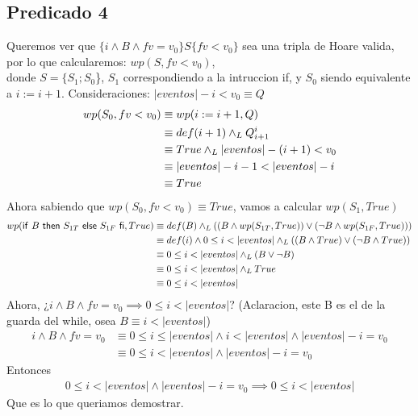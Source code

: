 \documentclass[../document.tex]{subfiles}
\begin{document}
\subsection*{Predicado 4}

Queremos ver que $\{i\land B\land fv=v_0\}S\{fv<v_0\}$ sea una tripla de Hoare valida, por lo que calcularemos: $wp(S, fv<v_0)$,
\\ donde $S=\{S_1;S_0$\}, $S_1$ correspondiendo a la intruccion if, y $S_0$ siendo equivalente a $i:=i+1$.
\salto{\baselineskip}
Consideraciones: $|eventos|-i<v_0 \equiv Q$
\begin{align*}
    wp(S_0, fv<v_0)&\equiv wp(i:=i+1, Q)
    \\&\equiv def(i+1)\yLuego Q_{i+1}^i
    \\&\equiv True\yLuego |eventos|-(i+1)<v_0
    \\&\equiv |eventos|-i-1<|eventos|-i
    \\&\equiv True
\end{align*}
Ahora sabiendo que $wp(S_0, fv<v_0) \equiv True$, vamos a calcular $wp(S_1, True)$
\begin{align*}
    wp(\mathsf{if}\ B\ \mathsf{then}\ S_{1T}\ \mathsf{else}\ S_{1F}\ \mathsf{fi}, True)&\equiv def(B) \land _L ((B\land wp(S_{1T},True))\lor (\lnot B \land wp(S_{1F},True)))
    \\&\equiv def(i) \land  0\leq i < |eventos| \land _L ((B\land True)\lor (\lnot B \land True))
    \\&\equiv 0\leq i < |eventos| \land _L (B\lor \lnot B)
    \\&\equiv 0\leq i < |eventos| \land _L True
    \\&\equiv 0\leq i < |eventos|
\end{align*}
\salto{\baselineskip}
Ahora, ¿$i\land B \land fv=v_0\implies 0\leq i < |eventos|$? (Aclaracion, este B es el de la guarda del while, osea $B\equiv i<|eventos|$)
\begin{align*}
    i\land B \land fv=v_0 &\equiv 0 \leq i\leq |eventos| \land i<|eventos| \land |eventos|-i=v_0
    \\&\equiv 0 \leq i<|eventos| \land |eventos|-i=v_0
\end{align*}
Entonces
\begin{align*}
    0 \leq i<|eventos| \land |eventos|-i=v_0\implies 0 \leq i<|eventos|
\end{align*}
Que es lo que queriamos demostrar.
\end{document}
